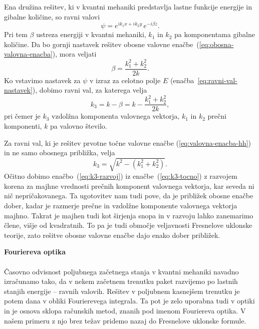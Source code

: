 Ena družina rešitev, ki v kvantni mehaniki predstavlja lastne funkcije
energije in gibalne količine, so ravni valovi
\begin{equation}
\psi=e^{ik_{1}x+ik_{2}y}\, e^{-i\beta z}.
\label{eq:ravni-val-nastavek-obosni}
\end{equation}
Pri tem $\beta$ ustreza energiji v kvantni mehaniki, $k_{1}$ in
$k_{2}$ pa komponentama gibalne količine. Da bo gornji nastavek rešitev
obosne valovne enačbe~(\ref{eq:obosna-valovna-enacba}), mora veljati 
\begin{equation}
\beta=\frac{k_{1}^{2}+k_{2}^{2}}{2k}.
\end{equation}
Ko vstavimo nastavek za $\psi$ v izraz za celotno polje $E$ 
(enačba~\ref{eq:ravni-val-nastavek}), dobimo ravni val, za katerega velja 
\begin{equation}
k_{3}=k-\beta=k-\frac{k_{1}^{2}+k_{2}^{2}}{2k},\label{eq:k3-razvoj}
\end{equation}
 pri čemer je $k_{3}$ vzdolžna komponenta valovnega vektorja, $k_{1}$ in
$k_{2}$ prečni komponenti, $k$ pa valovno število. 

Za ravni val, ki je rešitev prvotne točne valovne enačbe (\ref{eq:valovna-enacba-hh})
in ne samo obosnega približka, velja 
\begin{equation}
k_{3}=\sqrt{k^{2}-(k_{1}^{2}+k_{2}^{2})}.\label{eq:k3-tocno}
\end{equation}
Očitno dobimo enačbo~(\ref{eq:k3-razvoj}) iz enačbe~(\ref{eq:k3-tocno})
z razvojem korena za majhne vrednosti prečnih komponent valovnega
vektorja, kar seveda ni nič nepričakovanega. Ta ugotovitev nam tudi
pove, da je približek obosne enačbe dober, kadar je razmerje prečne
in vzdolžne komponente valovnega vektorja majhno. Takrat je majhen
tudi kot širjenja snopa in v razvoju lahko zanemarimo člene, višje
od kvadratnih. To pa je tudi območje veljavnosti Fresnelove uklonske
teorije, zato rešitve obosne valovne enačbe dajo enako dober približek.

\begin{remark}{{\bf Fouriereva optika}}\\ \\
Časovno odvisnost poljubnega začetnega
stanja v kvantni mehaniki navadno izračunamo tako, da v nekem začetnem
trenutku paket razvijemo po lastnih stanjih energije -- ravnih valovih.
Rešitev v poljubnem kasnejšem trenutku je potem dana v obliki Fourierevega
integrala. Ta pot je zelo uporabna tudi v optiki in je osnova sklopa
računskih metod, znanih pod imenom Fouriereva optika. V našem primeru
z njo brez težav pridemo nazaj do Fresnelove uklonske formule.
\end{remark}

